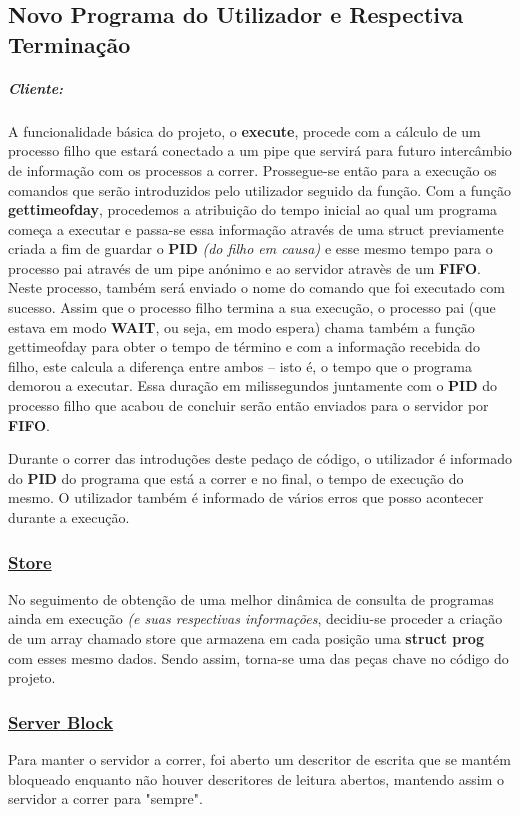 \documentclass{report}
\begin{document}
\subsection{Novo Programa do Utilizador e Respectiva Terminação}

\subparagraph{Cliente:}
A funcionalidade básica do projeto, o \textbf{execute}, procede com a cálculo de um processo filho que estará conectado a um pipe que servirá para futuro intercâmbio de informação com os processos a correr. Prossegue-se então para a execução os comandos que serão introduzidos pelo utilizador seguido da função.
Com a função \textbf{gettimeofday}, procedemos a atribuição do tempo inicial ao qual um programa começa a executar e passa-se essa informação através de uma struct previamente criada a fim de guardar o \textbf{PID} \textit{(do filho em causa)} e esse mesmo tempo para o processo pai através de um pipe anónimo e ao servidor atravès de um \textbf{FIFO}.\\
Neste processo, também será enviado o nome do comando que foi executado com sucesso.
Assim que o processo filho termina a sua execução, o processo pai (que estava em modo \textbf{WAIT}, ou seja, em modo espera) chama também a função gettimeofday para obter o tempo de término e com a informação recebida do filho, este calcula a diferença entre ambos – isto é, o tempo que o programa demorou a executar. Essa duração em milissegundos juntamente com o \textbf{PID} do processo filho que acabou de concluir serão então enviados para o servidor por \textbf{FIFO}.\par

Durante o correr das introduções deste pedaço de código, o utilizador é informado do \textbf{PID} do programa que está a correr e no final, o tempo de execução do mesmo. O utilizador também é informado de vários erros que posso acontecer durante a execução.

\subsubsection{\underline{Store}}
No seguimento de obtenção de uma melhor dinâmica de consulta de programas ainda em execução \textit{(e suas respectivas informações}, decidiu-se proceder a criação de um array chamado store que armazena em cada posição uma \textbf{struct prog} com esses mesmo dados. Sendo assim, torna-se uma das peças chave no código do projeto.
\subsubsection{\underline{Server Block}}
Para manter o servidor a correr, foi aberto um descritor de escrita que se mantém bloqueado enquanto não houver descritores de leitura abertos, mantendo assim o servidor a correr para "sempre".
\end{document}
